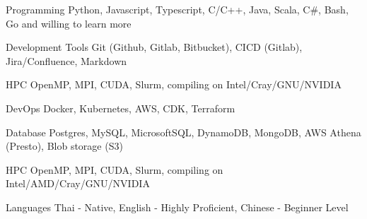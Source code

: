 

\begin{cvskills}

  \cvskill
    {Programming} %
    {Python, Javascript, Typescript, C/C++, Java, Scala, C\#, Bash, Go and willing to learn more} %

\cvskill
    {Development Tools} %
    {Git (Github, Gitlab, Bitbucket), CICD (Gitlab), Jira/Confluence, Markdown} %

  \cvskill
    {HPC} %
    {OpenMP, MPI, CUDA, Slurm, compiling on Intel/Cray/GNU/NVIDIA } %

  \cvskill
    {DevOps} %
    {Docker, Kubernetes, AWS, CDK, Terraform} %

  \cvskill
    {Database}
    {Postgres, MySQL, MicrosoftSQL, DynamoDB, MongoDB, AWS Athena (Presto), Blob storage (S3)}

\cvskill
  {HPC} %
  {OpenMP, MPI, CUDA, Slurm, compiling on Intel/AMD/Cray/GNU/NVIDIA } %

  \cvskill
    {Languages} %
    {Thai - Native, English - Highly Proficient, Chinese - Beginner Level} %

\end{cvskills}
